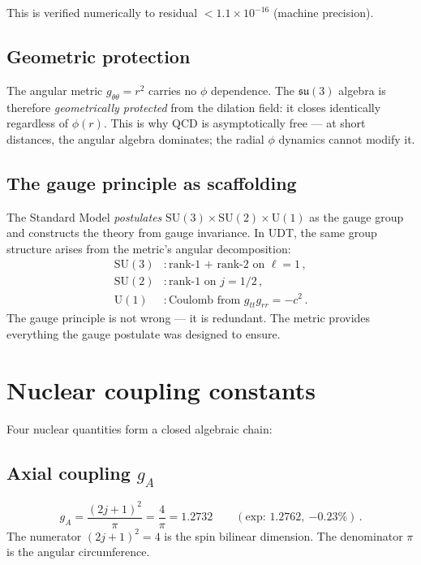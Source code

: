 \documentclass[11pt,letterpaper]{article}
\numberwithin{equation}{section}
\begin{document}
This is verified numerically to residual $< 1.1 \times 10^{-16}$
(machine precision).

\subsection{Geometric protection}

The angular metric $g_{\theta\theta} = r^2$ carries no $\phi$
dependence.  The $\mathfrak{su}(3)$ algebra is therefore
\emph{geometrically protected} from the dilation field: it closes
identically regardless of $\phi(r)$.  This is why QCD is
asymptotically free --- at short distances, the angular algebra
dominates; the radial $\phi$ dynamics cannot modify it.

\subsection{The gauge principle as scaffolding}

The Standard Model \emph{postulates} $\mathrm{SU}(3) \times
\mathrm{SU}(2) \times \mathrm{U}(1)$ as the gauge group and constructs
the theory from gauge invariance.  In UDT, the same group structure
arises from the metric's angular decomposition:
\begin{align}
  \mathrm{SU}(3) &: \text{rank-1 + rank-2 on } \ell = 1\,,\\
  \mathrm{SU}(2) &: \text{rank-1 on } j = 1/2\,,\\
  \mathrm{U}(1) &: \text{Coulomb from } g_{tt}g_{rr} = -c^2\,.
\end{align}
The gauge principle is not wrong --- it is redundant.  The metric
provides everything the gauge postulate was designed to ensure.

\section{Nuclear coupling constants}
\label{sec:nuclear}

Four nuclear quantities form a closed algebraic chain:

\subsection{Axial coupling $g_A$}

\begin{equation}\label{eq:gA}
  g_A = \frac{(2j+1)^2}{\pi} = \frac{4}{\pi} = 1.2732
  \qquad(\text{exp: }1.2762,\ {-0.23\%})\,.
\end{equation}
The numerator $(2j+1)^2 = 4$ is the spin bilinear dimension.  The
denominator $\pi$ is the angular circumference.
\end{document}
